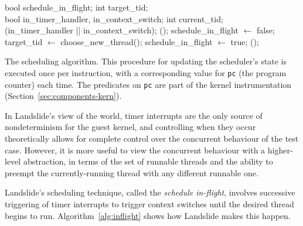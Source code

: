 \begin{algorithm*}[t!]
	\footnotesize
	\label{alg:inflight}
	\begin{algorithmic}
		\State bool schedule\_in\_flight;
		\State int target\_tid;
		\\
		\State bool in\_timer\_handler, in\_context\_switch;
		\State int current\_tid;
		\\
				(in\_timer\_handler || in\_context\_switch);
						();
					\Else
						\State schedule\_in\_flight $\gets$ false;
					\EndIf
				\EndIf
				\State target\_tid $\gets$ {\sc choose\_new\_thread}();
				\State schedule\_in\_flight $\gets$ true;
				();
			\EndIf
		\EndFunction
	\end{algorithmic}
	\caption{The scheduling algorithm. This procedure for updating the scheduler's state is executed once per instruction, with a corresponding value for \texttt{pc} (the program counter) each time. The predicates on \texttt{pc} are part of the kernel instrumentation (Section~\ref{sec:components-kern}).}
\end{algorithm*}

In Landslide's view of the world, timer interrupts are the only source of nondeterminism for the guest kernel, and controlling when they occur theoretically allows for complete control over the concurrent behaviour of the test case. However, it is more useful to view the concurrent behaviour with a higher-level abstraction, in terms of the set of runnable threads and the ability to preempt the currently-running thread with any different runnable one.

Landslide's scheduling technique, called the {\em schedule in-flight}, involves successive triggering of timer interrupts to trigger context switches until the desired thread begins to run. Algorithm~\ref{alg:inflight} shows how Landslide makes this happen.

